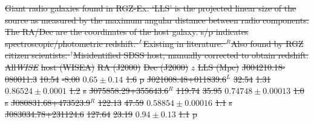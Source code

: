 \documentclass[11pt, a4paper]{book}
\providecommand{\DIFdeltex}[1]{{\protect\color{red}\sout{#1}}}                      %
\providecommand{\DIFdelFL}[1]{\DIFdel{#1}} %
\providecommand{\DIFdel}[1]{\texorpdfstring{\DIFdeltex{#1}}{}} %
\begin{document}
{%
\DIFdelFL{Giant radio galaxies found in RGZ-Ex. `LLS' is the projected linear size of the source as measured by the maximum angular distance between radio components. The RA/Dec are the coordinates of the host galaxy. s/p indicates spectroscopic/photometric redshift. ${}^L$Existing in literature. ${}^R$Also found by RGZ citizen scientists. ${}^\dagger$Misidentified SDSS host, manually corrected to obtain redshift.}}
\DIFdelFL{All}\emph{\DIFdelFL{WISE}} %
\DIFdelFL{host (WISEA) }%
\DIFdelFL{RA (J2000) }%
\DIFdelFL{Dec (J2000) }%
\DIFdelFL{$z$ }%
\DIFdelFL{LLS (Mpc) }%
\DIFdelFL{J004210.18-080011.3 }%
\DIFdelFL{10.54 }%
\DIFdelFL{-8.00 }%
\DIFdelFL{$0.65 \pm 0.14$ }%
\DIFdelFL{1.6 }%
\DIFdelFL{p}%
    \DIFdelFL{J021008.48+011839.6${}^L$ }%
\DIFdelFL{32.54 }%
\DIFdelFL{1.31 }%
\DIFdelFL{$0.86524 \pm 0.0001$ }%
\DIFdelFL{1.2 }%
\DIFdelFL{s}%
    \DIFdelFL{J075858.29+355643.6${}^R$ }%
\DIFdelFL{119.74 }%
\DIFdelFL{35.95 }%
\DIFdelFL{$0.74748 \pm 0.00013$ }%
\DIFdelFL{1.0 }%
\DIFdelFL{s}%
    \DIFdelFL{J080831.68+473523.9${}^R$ }%
\DIFdelFL{122.13 }%
\DIFdelFL{47.59 }%
\DIFdelFL{$0.58854 \pm 0.00016$ }%
\DIFdelFL{1.1 }%
\DIFdelFL{s}%
    \DIFdelFL{J083034.78+231124.6 }%
\DIFdelFL{127.64 }%
\DIFdelFL{23.19 }%
\DIFdelFL{$0.94 \pm 0.13$ }%
\DIFdelFL{1.1 }%
\DIFdelFL{p}%
\end{document}
